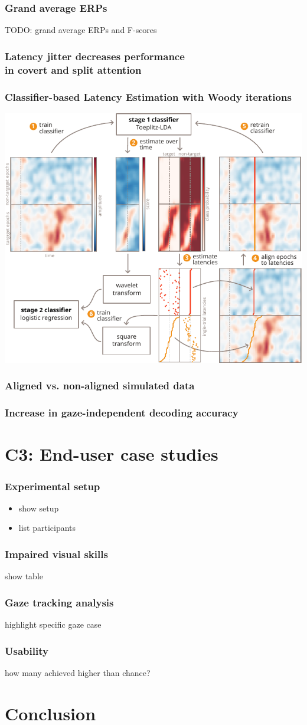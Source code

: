 \documentclass{kul-ulille-beamer}
\begin{document}
\begin{frame}
  \frametitle{Grand average ERPs}
  TODO: grand average ERPs and F-scores
\end{frame}

\begin{frame}[c]
  \frametitle{Latency jitter decreases performance \\ in covert and split
  attention \tiny\cite{Arico2014}}
  \begin{minipage}{.4\textwidth}
    
  \end{minipage}\hfill%
  \begin{minipage}{.55\textwidth}
    
  \end{minipage}
\end{frame}
\begin{frame}[c]
  \frametitle{Classifier-based Latency Estimation with Woody iterations}

  \includegraphics[width=.6\textwidth]{figures/covert/figure1.pdf}
\end{frame}
\begin{frame}
  \frametitle{Aligned vs. non-aligned simulated data}
\end{frame}
\begin{frame}
  \frametitle{Increase in gaze-independent decoding accuracy}
\end{frame}

\tocframe
\section{\textbf{C3}: End-user case studies}
\begin{frame}
  \frametitle{Experimental setup}
  \begin{itemize}
    \item show setup
    \item list participants
  \end{itemize}
\end{frame}
\begin{frame}
  \frametitle{Impaired visual skills}
  show table
\end{frame}
\begin{frame}
  \frametitle{Gaze tracking analysis}
  highlight specific gaze case
\end{frame}
\begin{frame}
  \frametitle{Usability}
  how many achieved higher than chance?
\end{frame}
\section{Conclusion}
\begin{frame}
\end{frame}
\end{document}

